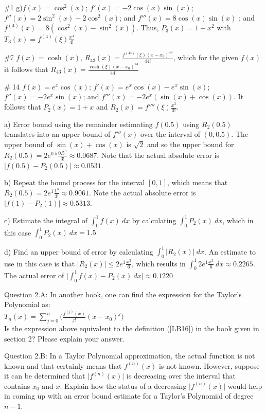 \documentclass{article}
\def\ds{\displaystyle}
\begin{document}
{\color{teal} 
\#1 g)$\ds f(x) = \cos^2(x)$; $\ds f'(x) = -2 \cos(x) \sin(x)$; $\ds f''(x) = 2 \sin^2(x) - 2 \cos^2(x)$; and $\ds f'''(x) = 8 \cos(x) \sin(x)$ ; and $\ds f^{(4)}(x)=8(\cos^2(x) - \sin^2(x))$. Thus, $\ds P_3(x) = 1 - x^2$ with $T_3(x) = f^{(4)}(\xi) \frac {x^4}{4!}$

\#7 $f(x) = \cosh(x)$, $\ds R_{43}(x) = \frac {f^{(44)}(\xi) (x-x_0)^{44}}{44!}$, which for the given $f(x)$ it follows that $\ds R_{43}(x) = \frac {\cosh(\xi) (x-x_0)^{44}}{44!}$\par \medskip \noindent
%
\# 14 $f(x) = e^x \cos (x)$; $\ds f'(x) = e^x \cos(x) - e^x \sin(x)$; $\ds f''(x) = -2 e^x \sin(x)$; and $\ds f'''(x)=-2e^x(\sin (x) + \cos (x))$. It follows that $\ds P_2(x) = 1 + x$ and $\ds R_2(x) = f''''(\xi) \frac {x^3}{3!}$.

a) Error bound using the remainder estimating $\ds f(0.5)$ using $\ds R_2(0.5)$ translates into an upper bound of $\ds f'''(x)$ over the interval of $(0,0.5)$. The upper bound of $\ds \sin (x) + \cos (x)$ is $\ds \sqrt{2}$ and so the upper bound for $\ds R_2(0.5) = 2e^{0.5}\frac {0.5^3}{3!} \approx 0.0687$. Note that the actual absolute error is $\ds \vert f(0.5) - P_2(0.5)\vert \approx  0.0531$.

b) Repeat the bound process for the interval $\ds [0,1]$, which means that $\ds R_2(0.5) = 2e^{1}\frac {1^3}{3!} \approx 0.9061$.  Note the actual absolute error is  $\ds \vert f(1) - P_2(1)\vert \approx  0.5313$.

c) Estimate the integral of $\ds \int_0^1 f(x) \  dx$ by calculating $\ds \int_0^1 P_2(x) \ dx$, which in this case  $\ds \int_0^1 P_2(x) \ dx = 1.5$

d) Find an upper bound of error by calculating $\ds \int_0^1\vert R_2(x) \vert \ dx $. An estimate to use in this case is that $\ds \vert R_2(x) \vert \le 2e^1\frac {x^3}6$, which results in $\ds \int_0^1  2e^1\frac {x^3}6 \ dx \approx  0.2265 $. The actual error of $\ds \biggr \vert  \int_0^1 f(x)-P_2(x) \ dx \biggr \vert \approx 0.1220$
}
\par \medskip \noindent
%
Question 2.A: In another book, one can find the expression for the Taylor's Polynomial as: \\
$\ds T_n(x) = \sum_{j=0}^n \biggr ( \frac {f^{(j)}(x)}{j!}(x-x_0)^j \biggr )$  \\
Is the expression above equivalent to the definition ([LB16]) in the book given in section 2?  Please explain your answer. \medskip \par \noindent
%
Question 2.B: In a Taylor Polynomial approximation, the actual function is not known and that certainly means that $\ds f^{(n)}(x)$ is not known. However, suppose it can be determined that  $\ds \vert f^{(n)}(x)\vert $ is decreasing over the interval that contains $x_0$ and $x$. Explain how the status of a decreasing $\ds \vert f^{(n)}(x)\vert $ would help in coming up with an error bound estimate for a Taylor's Polynomial of degree $n-1$. 
\end{document}
